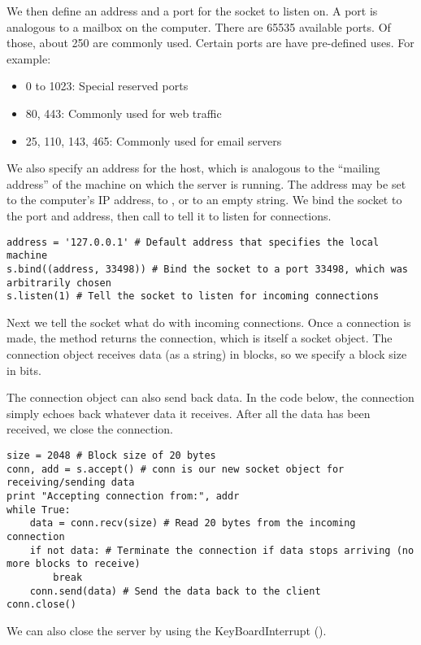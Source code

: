 We then define an address and a port for the socket to listen on.
A port is analogous to a mailbox on the computer.
There are 65535 available ports.
Of those, about 250 are commonly used.
Certain ports are have pre-defined uses. For example:
\begin{itemize}
    \item 0 to 1023: Special reserved ports
    \item  80, 443: Commonly used for web traffic
    \item 25, 110, 143, 465: Commonly used for email servers
\end{itemize}
We also specify an address for the host, which is analogous to the ``mailing address'' of the machine on which the server is running.
The address may be set to the computer's IP address, to , or to an empty string.
We bind the socket to the port and address, then call  to tell it to listen for connections.

\begin{lstlisting}
address = '127.0.0.1' # Default address that specifies the local machine
s.bind((address, 33498)) # Bind the socket to a port 33498, which was arbitrarily chosen
s.listen(1) # Tell the socket to listen for incoming connections
\end{lstlisting}

Next we tell the socket what do with incoming connections.
Once a connection is made, the  method returns the connection, which is itself a socket object.
The connection object receives data (as a string) in blocks, so we specify a block size in bits.

The connection object can also send back data.
In the code below, the connection simply echoes back whatever data it receives.
After all the data has been received, we close the connection.

\begin{lstlisting}
size = 2048 # Block size of 20 bytes
conn, add = s.accept() # conn is our new socket object for receiving/sending data
print "Accepting connection from:", addr
while True:
	data = conn.recv(size) # Read 20 bytes from the incoming connection
	if not data: # Terminate the connection if data stops arriving (no more blocks to receive)
		break
	conn.send(data) # Send the data back to the client
conn.close()
\end{lstlisting}

We can also close the server by using the KeyBoardInterrupt ().

